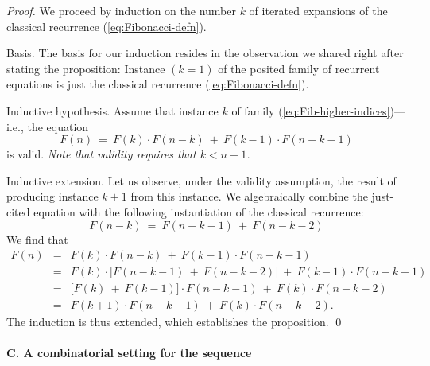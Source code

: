 \begin{proof}
\bigskip

\noindent {}
\bigskip

We proceed by induction on the number $k$ of iterated expansions of the classical recurrence (\ref{eq:Fibonacci-defn}).

\medskip

\noindent
{\sf Basis}.
The basis for our induction resides in the observation we shared right after stating the proposition: Instance $(k = 1)$ of the posited family of recurrent equations is just the classical recurrence (\ref{eq:Fibonacci-defn}).

\medskip

\noindent
{\sf Inductive hypothesis}.
Assume that instance $k$ of family (\ref{eq:Fib-higher-indices})---i.e., the equation
\[ F(n) \ = \ F(k) \cdot F(n-k) \ + \ F(k-1) \cdot F(n-k-1) \]
is valid.  {\em Note that validity requires that $k < n-1$.}

\medskip

\noindent
{\sf Inductive extension}.
Let us observe, under the validity assumption, the result of producing instance $k+1$ from this instance.  We algebraically combine the just-cited equation with the following instantiation of the classical recurrence:
\[ F(n-k) \ = \ F(n-k-1) \ + \ F(n-k-2) \]
We find that
\begin{eqnarray*}
F(n) & = & F(k) \cdot F(n-k) \ + \ F(k-1) \cdot F(n-k-1) \\
     & = & F(k) \cdot \big[ F(n-k-1) \ + \ F(n-k-2) \big]  \ +
             \ F(k-1) \cdot F(n-k-1) \\
     & = & \big[ F(k) \ + \ F(k-1) \big] \cdot F(n-k-1) \ + \ F(k)
             \cdot F(n-k-2) \\
     & = & F(k+1) \cdot F(n-k-1) \ + \ F(k) \cdot F(n-k-2).
\end{eqnarray*}
The induction is thus extended, which establishes the proposition.  \qed 
\end{proof}


\paragraph{C. A combinatorial setting for the sequence}

